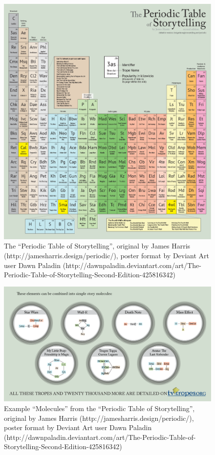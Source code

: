 \documentclass[11pt]{report}
\begin{document}
\begin{figure}[p!]
\centerline{\includegraphics[height=0.9\textheight]{periodicTable.png}}
\caption{The ``Periodic Table of Storytelling'', original by James Harris
  (http://jamesharris.design/periodic/), poster format by Deviant Art user Dawn
  Paladin (http://dawnpaladin.deviantart.com/art/The-Periodic-Table-of-Storytelling-Second-Edition-425816342)} \label{fig:periodic-table}
\end{figure}

\begin{figure}[t!]
\centerline{\includegraphics[width=\textwidth]{periodicExamples.png}}
\caption{Example ``Molecules'' from the ``Periodic Table of Storytelling'', original by James Harris
  (http://jamesharris.design/periodic/), poster format by Deviant Art user Dawn
  Paladin (http://dawnpaladin.deviantart.com/art/The-Periodic-Table-of-Storytelling-Second-Edition-425816342)} \label{fig:periodic-examples}
\end{figure}
\end{document}
